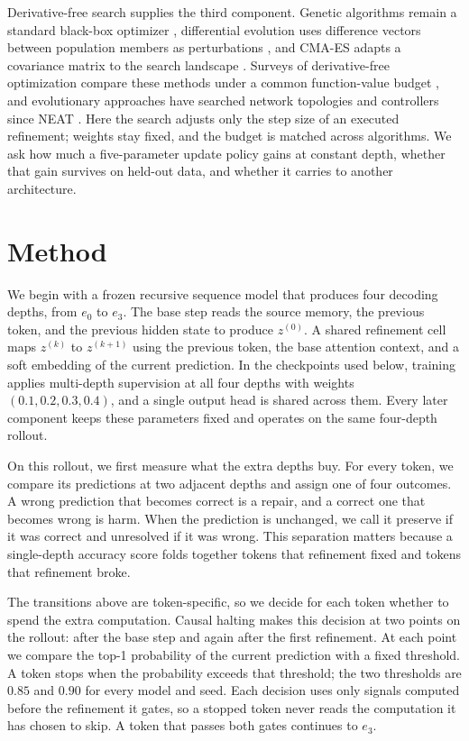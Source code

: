 \documentclass[11pt]{article}
\begin{document}
Derivative-free search supplies the third component. Genetic algorithms remain a standard black-box optimizer \citep{whitley1994tutorial}, differential evolution uses difference vectors between population members as perturbations \citep{storn1997de,das2011survey}, and CMA-ES adapts a covariance matrix to the search landscape \citep{hansen2001cma,hansen2003cma}. Surveys of derivative-free optimization compare these methods under a common function-value budget \citep{rios2013df}, and evolutionary approaches have searched network topologies and controllers since NEAT \citep{stanley2002neat,such2017neuro}. Here the search adjusts only the step size of an executed refinement; weights stay fixed, and the budget is matched across algorithms. We ask how much a five-parameter update policy gains at constant depth, whether that gain survives on held-out data, and whether it carries to another architecture.

\section{Method}
\label{sec:method}

We begin with a frozen recursive sequence model that produces four decoding depths, from $e_0$ to $e_3$. The base step reads the source memory, the previous token, and the previous hidden state to produce $z^{(0)}$. A shared refinement cell maps $z^{(k)}$ to $z^{(k+1)}$ using the previous token, the base attention context, and a soft embedding of the current prediction. In the checkpoints used below, training applies multi-depth supervision at all four depths with weights $(0.1,0.2,0.3,0.4)$, and a single output head is shared across them. Every later component keeps these parameters fixed and operates on the same four-depth rollout.

On this rollout, we first measure what the extra depths buy. For every token, we compare its predictions at two adjacent depths and assign one of four outcomes. A wrong prediction that becomes correct is a repair, and a correct one that becomes wrong is harm. When the prediction is unchanged, we call it preserve if it was correct and unresolved if it was wrong. This separation matters because a single-depth accuracy score folds together tokens that refinement fixed and tokens that refinement broke.

The transitions above are token-specific, so we decide for each token whether to spend the extra computation. Causal halting makes this decision at two points on the rollout: after the base step and again after the first refinement. At each point we compare the top-1 probability of the current prediction with a fixed threshold. A token stops when the probability exceeds that threshold; the two thresholds are $0.85$ and $0.90$ for every model and seed. Each decision uses only signals computed before the refinement it gates, so a stopped token never reads the computation it has chosen to skip. A token that passes both gates continues to $e_3$.
\end{document}
